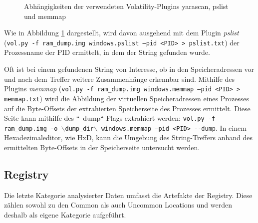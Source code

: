 \begin{figure}[h!]
	\centering
	\small
	\centerline{\resizebox{\linewidth}{!}{}}
	\caption{Abhängigkeiten der verwendeten Volatility-Plugins yarascan, pslist und memmap}
	\label{img:volatility-plugins}
\end{figure}

Wie in Abbildung \ref{img:volatility-plugins} dargestellt, wird davon ausgehend mit dem Plugin \textit{pslist} (\texttt{vol.py -f ram\_dump.img windows.pslist --pid <PID> > pslist.txt}) der Prozessname der PID ermittelt, in dem der String gefunden wurde.

Oft ist bei einem gefundenen String von Interesse, ob in den Speicheradressen vor und nach dem Treffer weitere Zusammenhänge erkennbar sind.
Mithilfe des Plugins \textit{memmap} (\texttt{vol.py -f ram\_dump.img windows.memmap --pid <PID> > memmap.txt}) wird die Abbildung der virtuellen Speicheradressen eines Prozesses auf die Byte-Offsets der extrahierten Speicherseite des Prozesses ermittelt.
Diese Seite kann mithilfe des ``--dump`` Flags extrahiert werden: \texttt{vol.py -f ram\_dump.img -o $\backslash$dump\_dir$\backslash$ windows.memmap --pid <PID> -{}-dump}.
In einem Hexadezimaleditor, wie HxD, kann die Umgebung des String-Treffers anhand des ermittelten Byte-Offsets in der Speicherseite untersucht werden.

\subsection{Registry}
\label{subsection:methodik-datenanalyse-registry}
Die letzte Kategorie analysierter Daten umfasst die Artefakte der Registry.
Diese zählen sowohl zu den Common als auch Uncommon Locations und werden deshalb als eigene Kategorie aufgeführt.

